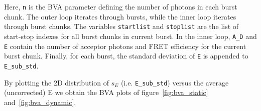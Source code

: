 Here, \verb|n| is the BVA parameter defining the number of photons in each burst chunk. 
The outer loop iterates through bursts, while the inner loop iterates through burst chunks.
The variables \verb|startlist| and \verb|stoplist| are the list of start-stop indexes for
all burst chunks in current burst.
In the inner loop, \verb|A_D| and \verb|E| contain the number of acceptor photons and 
FRET efficiency for the current burst chunk. Finally, for each burst, the standard deviation 
of \verb|E| is appended to \verb|E_sub_std|.

By plotting the 2D distribution of $s_E$ (i.e. \verb|E_sub_std|) versus the average (uncorrected) E 
we obtain the BVA plots of figure~\ref{fig:bva_static} and~\ref{fig:bva_dynamic}.


